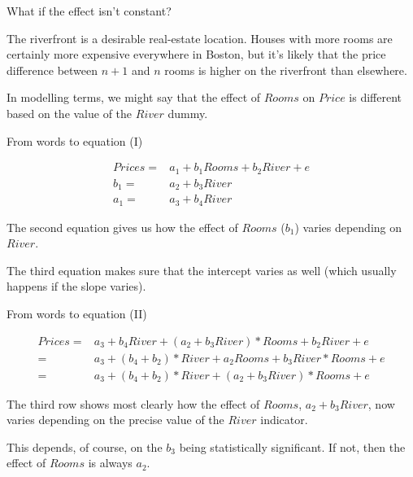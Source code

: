 \documentclass[12pt,english,pdf,xcolor=dvipsnames,aspectratio=169,handout]{beamer}\usepackage[]{graphicx}\usepackage[]{xcolor}
\begin{document}
\begin{frame}{What if the effect isn't constant?}

The riverfront is a desirable real-estate location. Houses with more rooms are certainly more expensive everywhere in Boston, but it's likely that the price difference between $n+1$ and $n$ rooms is higher on the riverfront than elsewhere.\bigskip

In modelling terms, we might say that the effect of $Rooms$ on $Price$ is different based on the value of the $River$ dummy.

\end{frame}


\begin{frame}{From words to equation (I)}

\begin{align}
Prices =& a_1 + b_1Rooms + b_2River + e \nonumber\\
b_1 =& a_2 + b_3River \nonumber\\
a_1 =& a_3 + b_4River \nonumber
\end{align}

The second equation gives us how the effect of $Rooms$ ($b_1$) varies depending on $River$.\bigskip

The third equation makes sure that the intercept varies as well (which usually happens if the slope varies).

\end{frame}


\begin{frame}{From words to equation (II)}

{\footnotesize
\begin{align}
Prices =& a_3 + b_4River + (a_2 + b_3River)*Rooms + b_2River + e \nonumber\\
  =& a_3 + (b_4+b_2)*River + a_2Rooms + b_3River*Rooms + e \nonumber \\
  =& a_3 + (b_4+b_2)*River + (a_2+b_3River)*Rooms + e
\end{align}
}%

The third row shows most clearly how the effect of $Rooms$, $a_2+b_3River$, now varies depending on the precise value of the $River$ indicator.\bigskip

This depends, of course, on the $b_3$ being statistically significant. If not, then the effect of $Rooms$ is always $a_2$.

\end{frame}
\end{document}
